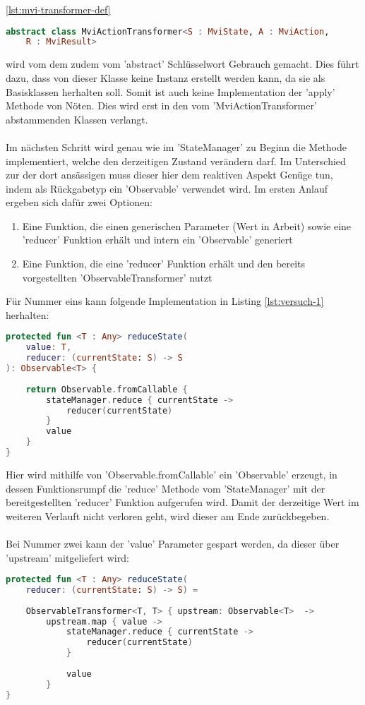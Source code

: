 \ref{lst:mvi-transformer-def}
\begin{lstlisting}[caption={MviActionTransformer Definition}, label={lst:mvi-transformer-def},
language=Kotlin]
abstract class MviActionTransformer<S : MviState, A : MviAction, 
	R : MviResult> 
\end{lstlisting}
\bigskip
wird vom dem zudem vom 'abstract' Schlüsselwort Gebrauch gemacht. Dies führt dazu, dass von dieser Klasse keine Instanz erstellt werden kann, da sie als Basisklassen herhalten soll. Somit ist auch keine Implementation der 'apply' Methode von Nöten. Dies wird erst in den vom 'MviActionTransformer' abstammenden Klassen verlangt.
\\\\
Im nächsten Schritt wird genau wie im 'StateManager' zu Beginn die Methode implementiert, welche den derzeitigen Zustand verändern darf. Im Unterschied zur der dort ansässigen muss dieser hier dem reaktiven Aspekt Genüge tun, indem als Rückgabetyp ein 'Observable' verwendet wird. Im ersten Anlauf ergeben sich dafür zwei Optionen:
\begin{enumerate}
	\item Eine Funktion, die einen generischen Parameter  (Wert in Arbeit) sowie eine 'reducer' Funktion erhält und intern ein 'Observable' generiert
	\item Eine Funktion, die eine 'reducer' Funktion erhält und den bereits vorgestellten 'ObservableTransformer' nutzt
\end{enumerate}
Für Nummer eins kann folgende Implementation in Listing
\ref{lst:versuch-1}
herhalten:
\begin{lstlisting}[caption={1. Versuch}, label={lst:versuch-1},language=Kotlin]
protected fun <T : Any> reduceState(
	value: T, 
	reducer: (currentState: S) -> S
): Observable<T> {
	
	return Observable.fromCallable {
		stateManager.reduce { currentState ->
			reducer(currentState)
		}
		value
	}
}
\end{lstlisting}
Hier wird mithilfe von 'Observable.fromCallable' ein 'Observable' erzeugt, in dessen Funktionsrumpf die 'reduce' Methode vom 'StateManager'  mit der bereitgestellten 'reducer' Funktion aufgerufen wird. Damit der derzeitige Wert im weiteren Verlauft nicht verloren geht, wird dieser am Ende zurückbegeben.
\\\\
Bei Nummer zwei kann der 'value' Parameter gespart werden, da dieser über 'upstream' mitgeliefert wird:
\begin{lstlisting}[caption={2. Versuch}, label={lst:versuch-2},language=Kotlin]
protected fun <T : Any> reduceState(
	reducer: (currentState: S) -> S) =
	
	ObservableTransformer<T, T> { upstream: Observable<T>  ->
		upstream.map { value ->
			stateManager.reduce { currentState ->
				reducer(currentState)
			}
		
			value
		}
}
\end{lstlisting}
